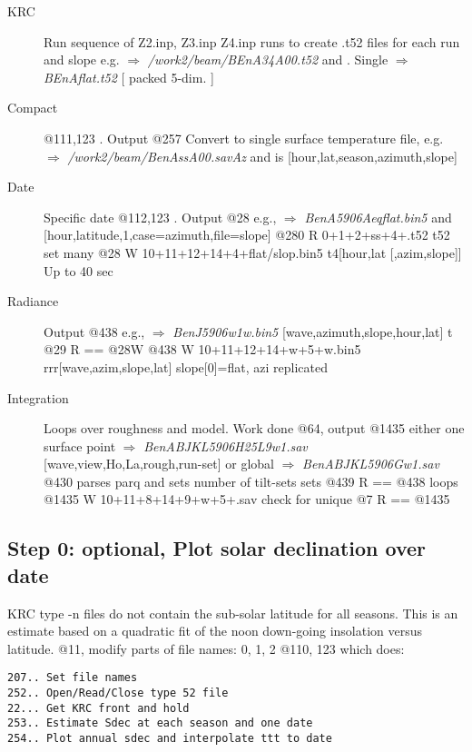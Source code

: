 \documentclass{article}
\newcommand{\qfo}[1]{$\Longrightarrow$ \textit{#1}} %
\begin{document}
\begin{description}  %
\item [KRC] Run sequence of Z2.inp, Z3.inp Z4.inp runs to create .t52 files for each run and slope
\qi e.g. \qfo{/work2/beam/BEnA34A00.t52} and .
 \qi Single \qfo{BEnAflat.t52} [ packed 5-dim. ]

\item[Compact] @111,123 . Output @257
Convert to single surface temperature file, e.g.
\qi  \qfo{/work2/beam/BenAssA00.savAz} and   is [hour,lat,season,azimuth,slope]
 
\item [Date] Specific date @112,123 . Output @28  e.g., 
\qi \qfo{BenA5906Aeqflat.bin5} and 
   [hour,latitude,1,case=azimuth,file=slope]
\qi  @280  R 0+1+2+ss+4+.t52        t52 set           many
\qi    @28  W 10+11+12+14+4+flat/slop.bin5  t4[hour,lat [,azim,slope]] 
\qi   Up to 40 sec

\item [Radiance] Output @438  e.g., \qfo{BenJ5906w1w.bin5} [wave,azimuth,slope,hour,lat] t
\qi    @29  R == @28W
\qi    @438 W 10+11+12+14+w+5+w.bin5   rrr[wave,azim,slope,lat]  slope[0]=flat, azi replicated


\item[Integration] Loops over roughness and model. Work done @64,  output @1435 
\qi either one surface point \qfo{BenABJKL5906H25L9w1.sav}  [wave,view,Ho,La,rough,run-set]
\qi  or global  \qfo{BenABJKL5906Gw1.sav} 
\\ @430 parses parq and  sets number of tilt-sets sets
\qi    @439 R == @438    loops
\qi   @1435 W  10+11+8+14+9+w+5+.sav   check for unique
\qi    @7  R == @1435


\end{description}

\subsection{Step 0: optional, Plot solar declination over date}

KRC type -n files do not contain the sub-solar latitude for all seasons. 
This is an estimate based on a quadratic fit of the noon down-going insolation versus latitude.
@11, modify parts of file names: 0, 1, 2
\qi @110, 123 which does:
\vspace{-3.mm} 
\begin{verbatim}
207.. Set file names
252.. Open/Read/Close type 52 file
22... Get KRC front and hold
253.. Estimate Sdec at each season and one date
254.. Plot annual sdec and interpolate ttt to date
\end{verbatim}
\end{document}
